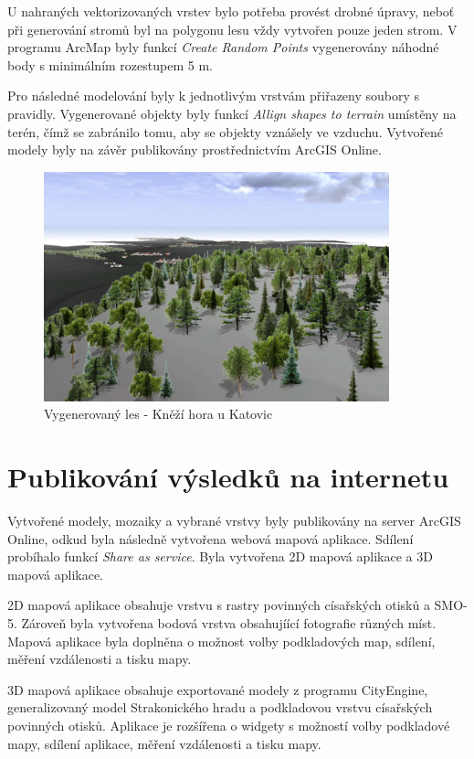 \documentclass[thesis=M,czech]{FITthesis}[2012/06/26]
\begin{document}
U nahraných vektorizovaných vrstev bylo potřeba provést drobné úpravy, neboť při generování stromů byl na polygonu lesu vždy vytvořen pouze jeden strom. V programu ArcMap byly funkcí \textit{Create Random Points} vygenerovány náhodné body s minimálním rozestupem 5 m. 

Pro následné modelování byly k jednotlivým vrstvám přiřazeny soubory s pravidly. Vygenerované objekty byly funkcí \textit{Allign shapes to terrain} umístěny na terén, čímž se zabránilo tomu, aby se objekty vznášely ve vzduchu. Vytvořené modely byly na závěr publikovány prostřednictvím ArcGIS Online.

\begin{figure}[h]
	\centering
	\includegraphics[width=10cm]{pics/lesy_knezihora.png}
	\caption{Vygenerovaný les - Kněží hora u Katovic}
	\label{obrazek:knezihora}
\end{figure}


\section{Publikování výsledků na internetu}
Vytvořené modely, mozaiky a vybrané vrstvy byly publikovány na server ArcGIS Online, odkud byla následně vytvořena webová mapová aplikace. Sdílení probíhalo funkcí \textit{Share as service}. Byla vytvořena 2D mapová aplikace a 3D mapová aplikace. 

2D mapová aplikace obsahuje vrstvu s rastry povinných císařských otisků a SMO-5. Zároveň byla vytvořena bodová vrstva obsahujíící fotografie různých míst. Mapová aplikace byla doplněna o možnost volby podkladových map, sdílení, měření vzdálenosti a tisku mapy. 

3D mapová aplikace obsahuje exportované modely z programu CityEngine, generalizovaný model Strakonického hradu a podkladovou vrstvu císařských povinných otisků. Aplikace je rozšířena o widgety s možností volby podkladové mapy, sdílení aplikace, měření vzdálenosti a tisku mapy.
\end{document}
